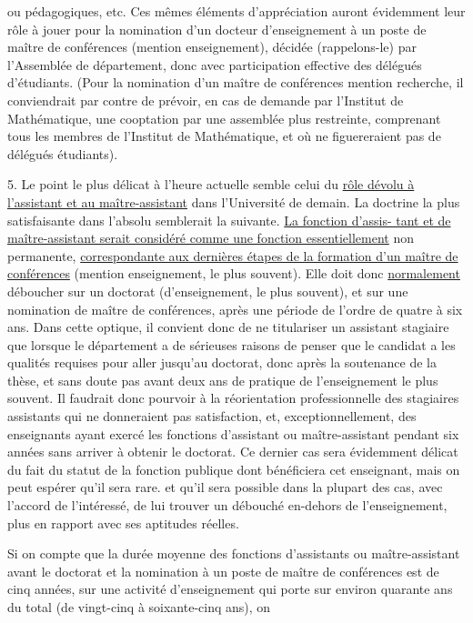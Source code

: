 
ou pédagogiques, etc. Ces mêmes éléments d'appréciation auront évidemment leur
rôle à jouer pour la nomination d'un docteur d'enseignement à un poste de
maître de conférences (mention enseignement), décidée (rappelons-le) par
l'Assemblée de département, donc avec participation effective des délégués
d'étudiants. (Pour la nomination d'un maître de conférences mention recherche,
il conviendrait par contre de prévoir, en cas de demande par l'Institut de
Mathématique, une cooptation par une assemblée plus restreinte, comprenant
tous les membres de l'Institut de Mathématique, et où ne figuereraient pas de
délégués étudiants).

5. Le point le plus délicat à l'heure actuelle semble celui du \uline{rôle dévolu à
l'assistant et au maître-assistant} dans l'Université de demain. La doctrine
la plus satisfaisante dans l'absolu semblerait la suivante. \uline{La fonction d'assis-%
tant et de maître-assistant serait considéré comme une fonction essentiellement}
non permanente, \uline{correspondante aux dernières étapes de la formation d'un
maître de conférences} (mention enseignement, le plus souvent). Elle doit donc
\uline{normalement} déboucher sur un doctorat (d'enseignement, le plus souvent), et
sur une nomination de maître de conférences, après une période de l'ordre de
quatre à six ans. Dans cette optique, il convient donc de ne titulariser un
assistant stagiaire que lorsque le département a de sérieuses raisons de penser
que le candidat a les qualités requises pour aller jusqu'au doctorat, donc
après la soutenance de la thèse, et sans doute pas avant deux ans de pratique
de l'enseignement le plus souvent. Il faudrait donc pourvoir à la réorientation
professionnelle des stagiaires assistants qui ne donneraient pas satisfaction,
et, exceptionnellement, des enseignants ayant exercé les fonctions d'assistant
ou maître-assistant pendant six années sans arriver à obtenir le doctorat. Ce
dernier cas sera évidemment délicat du fait du statut de la fonction publique
dont bénéficiera cet enseignant, mais on peut espérer qu'il sera rare. et
qu'il sera possible dans la plupart des cas, avec l'accord de l'intéressé, de
lui trouver un débouché en-dehors de l'enseignement, plus en rapport avec ses
aptitudes réelles.

Si on compte que la durée moyenne des fonctions d'assistants ou
maître-assistant avant le doctorat et la nomination à un poste de maître de
conférences est de cinq années, sur une activité d'enseignement qui porte
sur environ quarante ans du total (de vingt-cinq à soixante-cinq ans), on

